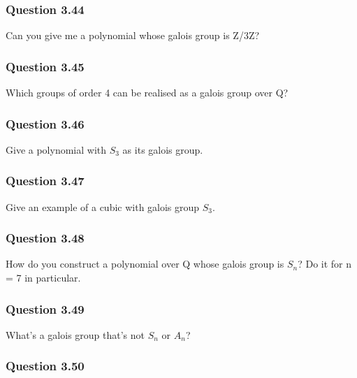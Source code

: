\hypertarget{question-3.44}{%
\subsubsection{Question 3.44}\label{question-3.44}}

Can you give me a polynomial whose galois group is Z/3Z?

\hypertarget{question-3.45}{%
\subsubsection{Question 3.45}\label{question-3.45}}

Which groups of order 4 can be realised as a galois group over Q?

\hypertarget{question-3.46}{%
\subsubsection{Question 3.46}\label{question-3.46}}

Give a polynomial with \(S_3\) as its galois group.

\hypertarget{question-3.47}{%
\subsubsection{Question 3.47}\label{question-3.47}}

Give an example of a cubic with galois group \(S_3\).

\hypertarget{question-3.48}{%
\subsubsection{Question 3.48}\label{question-3.48}}

How do you construct a polynomial over Q whose galois group is \(S_n\)?
Do it for n = 7 in particular.

\hypertarget{question-3.49}{%
\subsubsection{Question 3.49}\label{question-3.49}}

What's a galois group that's not \(S_n\) or \(A_n\)?

\hypertarget{question-3.50}{%
\subsubsection{Question 3.50}\label{question-3.50}}

